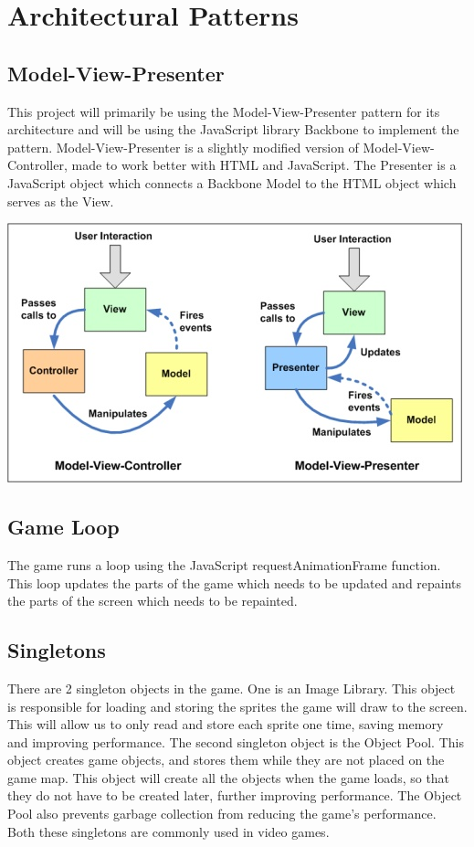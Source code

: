 \section{Architectural Patterns}

\subsection*{Model-View-Presenter}
This project will primarily be using the Model-View-Presenter pattern for its architecture and will 
be using the JavaScript library Backbone to implement the pattern. Model-View-Presenter is a slightly
modified version of Model-View-Controller, made to work better with HTML and JavaScript. The Presenter
is a JavaScript object which connects a Backbone Model to the HTML object which serves as the View.

\includegraphics{pictures/mvc_mvp}

\subsection*{Game Loop}
The game runs a loop using the JavaScript requestAnimationFrame function. This loop updates the parts 
of the game which needs to be updated and repaints the parts of the screen which needs to be repainted.

\subsection*{Singletons}
There are 2 singleton objects in the game. One is an Image Library. This object is responsible for 
loading and storing the sprites the game will draw to the screen. This will allow us to only read and 
store each sprite one time, saving memory and improving performance. The second singleton object is 
the Object Pool. This object creates game objects, and stores them while they are not placed on the 
game map. This object will create all the objects when the game loads, so that they do not have to 
be created later, further improving performance. The Object Pool also prevents garbage collection 
from reducing the game's performance. Both these singletons are commonly used in video games.
